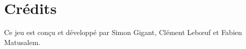 \documentclass[a4paper]{scrreprt}
\begin{document}


\chapter{Crédits}

Ce jeu est conçu et développé par Simon Gigant, Clément Leb\oe uf et Fabien Matusalem.


%
%
\end{document}
